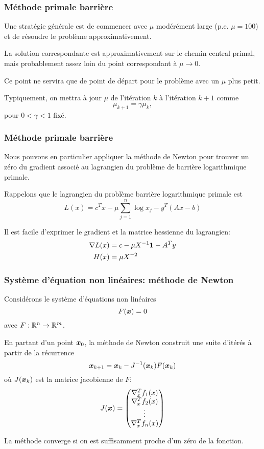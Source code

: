 \documentclass[usepdftitle=false, aspectratio=169]{beamer}
\begin{document}
\begin{frame}
\frametitle{Méthode primale barrière}

Une stratégie générale est de commencer avec $\mu$ modérément large (p.e. $\mu = 100$) et de résoudre le problème approximativement.

\mbox{}

La solution correspondante est approximativement sur le chemin central primal, mais probablement assez loin du point correspondant à $\mu \rightarrow 0$.

\mbox{}

Ce point ne servira que de point de départ pour le problème avec un $\mu$ plus petit.

\mbox{}

Typiquement, on mettra à jour $\mu$ de l'itération $k$ à l'itération $k+1$ comme
\[
\mu_{k+1} = \gamma \mu_k,
\]
pour $0< \gamma < 1$ fixé.

\end{frame}

\begin{frame}
\frametitle{Méthode primale barrière}

Nous pouvons en particulier appliquer la méthode de Newton pour trouver un zéro du gradient associé au lagrangien du problème de barrière logarithmique primale.

\mbox{}

Rappelons que le lagrangien du problème barrière logarithmique primale est
$$
L(x) = c^Tx - \mu \sum_{j = 1}^n \log x_j - y^T(Ax-b)
$$

\mbox{}

Il est facile d'exprimer le gradient et la matrice hessienne du lagrangien:
\begin{align*}
\nabla L(x) &= c-\mu X^{-1}{\boldsymbol{1}} - A^Ty \\
H(x) & = \mu X^{-2}
\end{align*}

\end{frame}

\begin{frame}
	\frametitle{Système d'équation non linéaires: méthode de Newton}
	
	Considérons le système d'équations non linéaires
	$$
	F({\boldsymbol{x}}) = 0
	$$
	avec $F: {\mathbb{R}}^n \rightarrow {\mathbb{R}}^m$.
	
	\mbox{}
	
	En partant d'un point ${\boldsymbol{x}}_0$, la méthode de Newton construit une suite d'itérés à partir de la récurrence
	$$
	{\boldsymbol{x}}_{k+1} = {\boldsymbol{x}}_k - J^{-1}({\boldsymbol{x}}_k) F({\boldsymbol{x}}_k)
	$$
	où $J({\boldsymbol{x}}_k)$ est la matrice jacobienne de $F$:
	\[
	J({\boldsymbol{x}}) =
	\begin{pmatrix}
		\nabla^T_x f_1(x) \\
		\nabla^T_x f_2(x) \\
		\vdots \\
		\nabla^T_x f_n(x) \\
	\end{pmatrix}
	\]
	
	La méthode converge si on est suffisamment proche d'un zéro de la fonction.
	
\end{frame}
\end{document}
